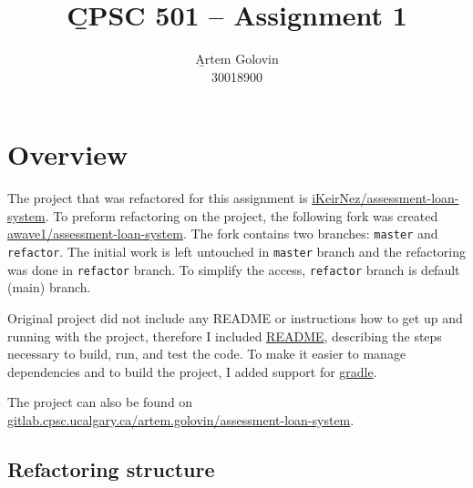 \documentclass{article}
\title{\b{CPSC 501 -- Assignment 1}}
\author{\b{Artem Golovin} \\ 30018900}
\date{}
\newcommand{\code}[1]{\texttt{#1}}
\begin{document}
\maketitle


\section*{Overview}

The project that was refactored for this assignment is \href{https://github.com/iKeirNez/assessment-loan-system}{iKeirNez/assessment-loan-system}. To preform refactoring on the project, the following fork was created \href{https://github.com/awave1/assessment-loan-system}{awave1/assessment-loan-system}. The fork contains two branches: \code{master} and \code{refactor}. The initial work is left untouched in \code{master} branch and the refactoring was done in \code{refactor} branch. To simplify the access, \code{refactor} branch is default (main) branch.

Original project did not include any README or instructions how to get up and running with the project, therefore I included \href{https://github.com/awave1/assessment-loan-system/blob/refactor/README.md}{README}, describing the steps necessary to build, run, and test the code. To make it easier to manage dependencies and to build the project, I added support for \href{https://gradle.org/}{gradle}.

The project can also be found on \href{https://gitlab.cpsc.ucalgary.ca/artem.golovin/assessment-loan-system}{gitlab.cpsc.ucalgary.ca/artem.golovin/assessment-loan-system}.

  \subsection*{Refactoring structure}
\end{document}
